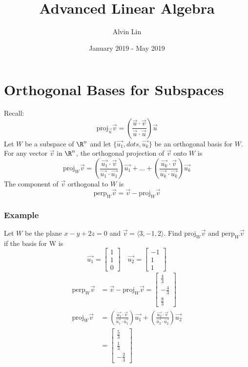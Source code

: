 \documentclass{math}
\title{Advanced Linear Algebra}
\author{Alvin Lin}
\date{January 2019 - May 2019}
\begin{document}
\maketitle

\section*{Orthogonal Bases for Subspaces}
Recall:
\[ \text{proj}_{\vec{u}}\vec{v} =
  \left(\frac{\vec{u}\cdot\vec{v}}{\vec{u}\cdot\vec{u}}\right)\vec{u} \]
Let \( W \) be a subspace of \( \R^n \) and let
\( \{\vec{u_1},dots,\vec{u_k}\} \) be an orthogonal basis for \( W \). For any
vector \( \vec{v} \) in \( \R^n \), the orthogonal projection of \( \vec{v} \)
onto \( W \) is
\[ \text{proj}_{W}\vec{v} =
  \left(\frac{\vec{u_1}\cdot\vec{v}}{\vec{u_1}\cdot\vec{u_1}}\right)\vec{u_1}+
  \dots+
  \left(\frac{\vec{u_k}\cdot\vec{v}}{\vec{u_k}\cdot\vec{u_k}}\right)\vec{u_k} \]
The component of \( \vec{v} \) orthogonal to \( W \) is
\[ \text{perp}_{W}\vec{v} = \vec{v}-\text{proj}_{W}\vec{v} \]

\subsubsection*{Example}
Let \( W \) be the plane \( x-y+2z = 0 \) and \( \vec{v} = \langle3,-1,2\rangle
\). Find \( \text{proj}_{W}\vec{v} \) and \( \text{perp}_{W}\vec{v} \) if the
basis for W is
\[ \vec{u_1} = \begin{bmatrix}1 \\ 1 \\ 0\end{bmatrix} \quad
  \vec{u_2} = \begin{bmatrix}-1 \\ 1 \\ 1\end{bmatrix} \]
\begin{align*}
  \text{perp}_{W}\vec{v} &= \vec{v}-\text{proj}_{W}\vec{v} = \begin{bmatrix}
    \frac{4}{3} \\ -\frac{4}{3} \\ \frac{8}{3}\end{bmatrix} \\
  \text{proj}_{W}\vec{v} &=
    \left(\frac{\vec{u_1}\cdot\vec{v}}{\vec{u_1}\cdot\vec{u_1}}\right)\vec{u_1}+
    \left(\frac{\vec{u_2}\cdot\vec{v}}{\vec{u_2}\cdot\vec{u_2}}\right)\vec{u_2}
    \\
  &= \begin{bmatrix}
    \frac{5}{3} \\ \frac{1}{3} \\ -\frac{2}{3}
  \end{bmatrix}
\end{align*}
\end{document}
